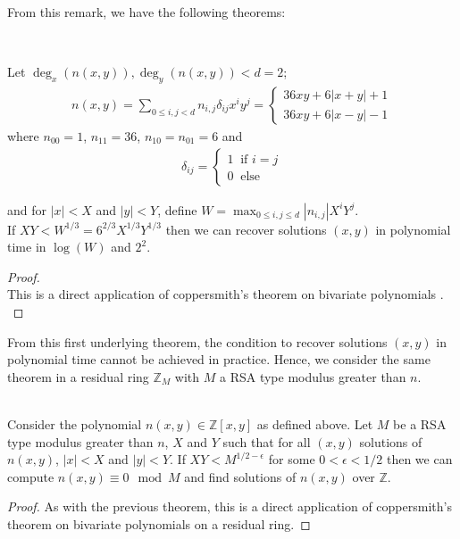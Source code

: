 \documentclass[sigconf,balance=false]{acmart}
\begin{document}
From this remark, we have the following theorems:
\begin{theorem} \ \\ \rm{
Let $\displaystyle\deg_{x}\left(n(x, y)\right), \deg_{y}\left(n(x, y)\right) < d=2$;
\begin{eqnarray*}
n(x, y)=\displaystyle\sum_{0\leq i, j < d}n_{i,j}\delta_{ij}x^{i}y^{j}=
\left\lbrace
\begin{array}{ll}
36xy+6\left|x+y\right|+1\\
36xy+6\left|x-y \right|-1
\end{array} \right.
\end{eqnarray*}
where $n_{00}=1$, $n_{11}=36$, $n_{10}=n_{01}=6$ and \begin{eqnarray*}
\delta_{ij}=
\left\lbrace
\begin{array}{ll}
1 \ \text{ if } i=j\\
0 \ \text{ else }
\end{array} \right.
\end{eqnarray*}


and for $\vert x \vert <X$ and $\vert y \vert <Y$, define $W=\displaystyle\max_{0\leq i, j \leq d}\left|n_{i, j}\right|X^{i}Y^{j}$.\\
If $XY<W^{1/3}=6^{2/3}X^{1/3}Y^{1/3}$ then we can recover solutions $(x, y)$ in polynomial time in $\log(W)$ and $2^{2}$.
}
\end{theorem}
\begin{proof} \ \\ \rm{
This is a direct application of coppersmith's theorem on bivariate polynomials \cite{coppersmith}.
}
\end{proof}
From this first underlying theorem, the condition to recover solutions $(x, y)$ in polynomial time cannot be achieved in practice. Hence, we consider the same theorem in a residual ring $\mathbb{Z}_{M}$ with $M$ a RSA type modulus greater than $n$.

\begin{theorem} \ \\ \rm{
Consider the polynomial $n(x, y)\in\mathbb{Z}[x, y]$ as defined above. Let $M$ be a RSA type modulus greater than $n$, $X$ and $Y$ such that for all $(x, y)$ solutions of $n(x, y)$,   $\vert x \vert <X$ and $\vert y \vert <Y$. If $XY<M^{1/2-\epsilon}$ for some $0<\epsilon<1/2$ then we can compute $n(x, y) \equiv 0\mod M$ and find solutions of $n(x, y)$ over $\mathbb{Z}$.
}
\end{theorem}
\begin{proof}
As with the previous theorem, this is a direct application of coppersmith's theorem on bivariate polynomials \cite{coppersmith} on a residual ring.
\end{proof}
\end{document}
